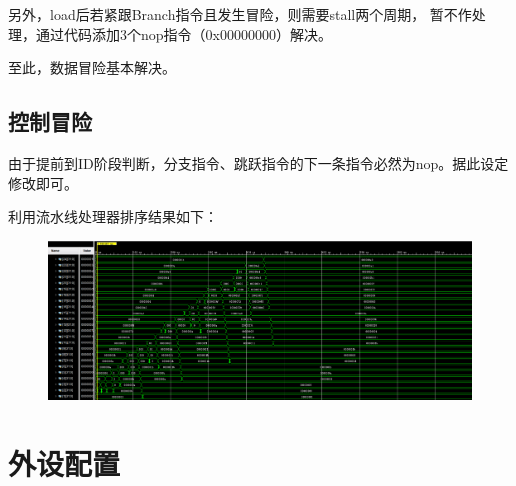\documentclass[10pt]{article}
\begin{document}
    另外，load后若紧跟Branch指令且发生冒险，则需要stall两个周期，
    暂不作处理，通过代码添加3个nop指令（0x00000000）解决。

    至此，数据冒险基本解决。
\subsection{控制冒险}
由于提前到ID阶段判断，分支指令、跳跃指令的下一条指令必然为nop。据此设定
修改即可。

利用流水线处理器排序结果如下：
\begin{figure}[H]
    \centering
    \includegraphics[scale=0.3]{mult.png}
    \end{figure}

\section{外设配置}
\end{document}
